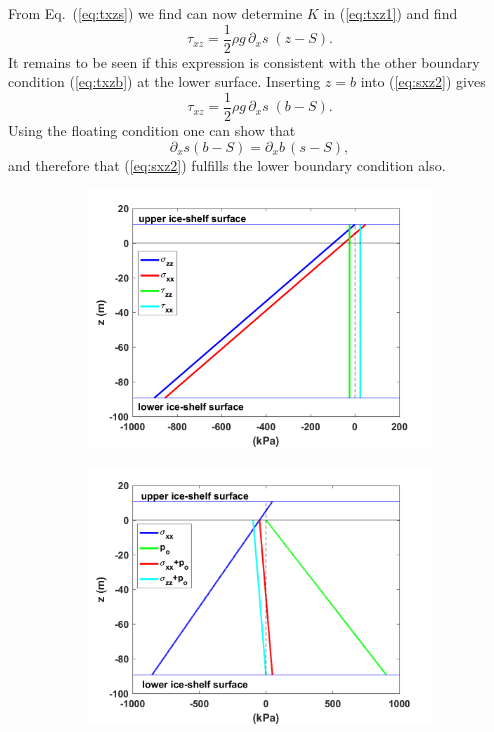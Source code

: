\documentclass[10pt,a4paper]{book}
\newcommand{\p}{\partial}
\newcommand{\txz}{\tau_{xz}}
\begin{document}
From Eq.~(\ref{eq:txzs}) we find can now determine $K$ in (\ref{eq:txz1}) and find
\begin{equation}
\txz=\frac{1}{2} \rho g \, \p_x s \; (z-S) .
\label{eq:sxz2}
\end{equation}
It remains to be seen if this expression is consistent with the other
boundary condition (\ref{eq:txzb}) at the lower surface. Inserting
$z=b$ into (\ref{eq:sxz2}) gives
\begin{equation} 
\txz=\frac{1}{2} \rho g \, \p_x s \; (b-S) .
\label{eq:sxz3}
\end{equation}
Using the floating condition one can show that
\[
\p_x s (b-S) = \p_x b \, (s-S),
\]
and therefore that (\ref{eq:sxz2}) fulfills the lower boundary condition also.


\begin{figure}
\begin{subfigure}{0.5\textwidth}
\centering
\includegraphics[width=\textwidth]{IceShelfStresses.png}
\end{subfigure}
\begin{subfigure}{0.5\textwidth}
\centering
\includegraphics[width=\textwidth]{IceShelfStressesAndPressure.png}

\end{subfigure}
\end{figure}
\end{document}

